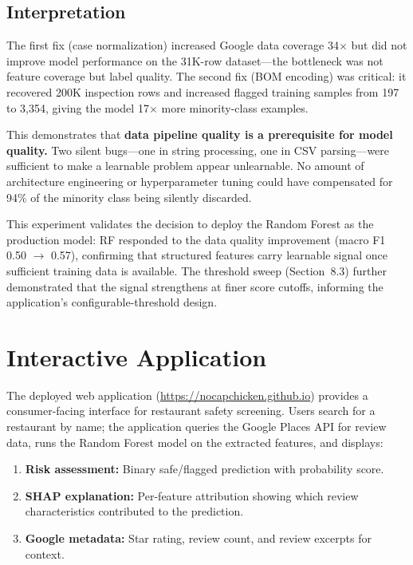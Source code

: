 \documentclass{article}
\begin{document}
\subsection{Interpretation}

The first fix (case normalization) increased Google data coverage 34$\times$ but did not improve model performance on the 31K-row dataset---the bottleneck was not feature coverage but label quality. The second fix (BOM encoding) was critical: it recovered 200K inspection rows and increased flagged training samples from 197 to 3,354, giving the model 17$\times$ more minority-class examples.

This demonstrates that \textbf{data pipeline quality is a prerequisite for model quality.} Two silent bugs---one in string processing, one in CSV parsing---were sufficient to make a learnable problem appear unlearnable. No amount of architecture engineering or hyperparameter tuning could have compensated for 94\% of the minority class being silently discarded.

This experiment validates the decision to deploy the Random Forest as the production model: RF responded to the data quality improvement (macro F1 0.50 $\rightarrow$ 0.57), confirming that structured features carry learnable signal once sufficient training data is available. The threshold sweep (Section~8.3) further demonstrated that the signal strengthens at finer score cutoffs, informing the application's configurable-threshold design.

\section{Interactive Application}

The deployed web application (\url{https://nocapchicken.github.io}) provides a consumer-facing interface for restaurant safety screening. Users search for a restaurant by name; the application queries the Google Places API for review data, runs the Random Forest model on the extracted features, and displays:

\begin{enumerate}
    \item \textbf{Risk assessment:} Binary safe/flagged prediction with probability score.
    \item \textbf{SHAP explanation:} Per-feature attribution showing which review characteristics contributed to the prediction.
    \item \textbf{Google metadata:} Star rating, review count, and review excerpts for context.
\end{enumerate}
\end{document}

